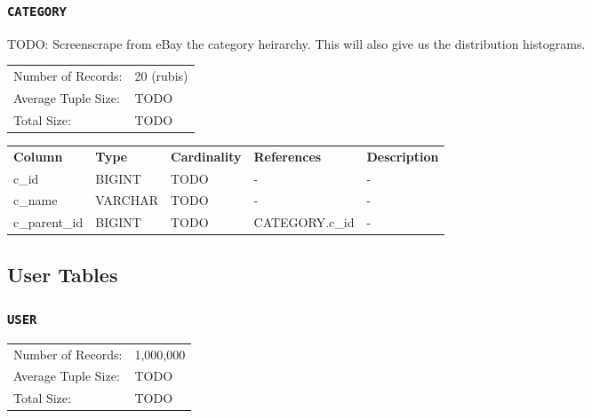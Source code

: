 \documentclass[a4paper,10pt]{article}
\begin{document}
\subsubsection{\texttt{CATEGORY}}
TODO: Screenscrape from eBay the category heirarchy. This will also give us the distribution histograms.

\begin{tabular}{ll}
Number of Records:      & 20 (rubis) \\
Average Tuple Size:     & TODO \\
Total Size:             & TODO \\
\end{tabular}

\vspace*{0.1in}

\noindent \begin{tabular*}{\textwidth}{@{\extracolsep{\fill}} lllll}
\textbf{Column} & \textbf{Type} & \textbf{Cardinality} & \textbf{References} & \textbf{Description} \\
c\_id              & BIGINT     & TODO & -               & - \\
c\_name            & VARCHAR    & TODO & -               & - \\
c\_parent\_id      & BIGINT     & TODO & CATEGORY.c\_id  & - \\
\end{tabular*}

\subsection{User Tables}

\subsubsection{\texttt{USER}}


\begin{tabular}{ll}
Number of Records:      & 1,000,000 \\
Average Tuple Size:     & TODO \\
Total Size:             & TODO \\
\end{tabular}

\vspace*{0.1in}
\end{document}
